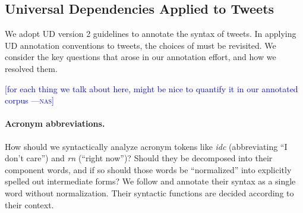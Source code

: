 \documentclass[11pt,a4paper]{article}
\newcommand{\yjcomment}[1]{\textcolor{orange}{[$_\mathrm{L}^\mathrm{Y}$#1]}}
\newcommand{\nascomment}[1]{\textcolor{blue}{[#1 ---\textsc{nas}]}}
\begin{document}
\subsection{Universal Dependencies Applied to Tweets}

We adopt UD version 2 guidelines to annotate the syntax of tweets.
In applying UD annotation conventions to tweets, the choices of 
 must be revisited.  We consider the
key questions that arose in our annotation effort, and how we resolved them.

\nascomment{for each thing we talk about here, might be nice to
  quantify it in our annotated corpus}




\paragraph{Acronym abbreviations.}  How should we syntactically
analyze acronym tokens like \emph{idc}
(abbreviating ``I don't care'') and \emph{rn} (``right now'')?  Should
they be decomposed into their component words, and if so should those
words be ``normalized'' into explicitly spelled out intermediate
forms? We follow \citet{kong-EtAl:2014:EMNLP2014} and annotate their
syntax as a single word without normalization. Their syntactic functions
are decided according to their context.
\end{document}
